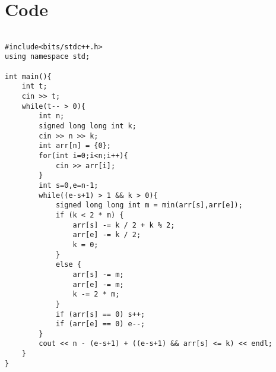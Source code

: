 \documentclass{article}
\begin{document}
\newpage
\section{Code}

\begin{lstlisting}

#include<bits/stdc++.h>
using namespace std;

int main(){
    int t;
    cin >> t;
    while(t-- > 0){
        int n;
        signed long long int k;
        cin >> n >> k;
        int arr[n] = {0};
        for(int i=0;i<n;i++){
            cin >> arr[i];
        }
        int s=0,e=n-1;
        while((e-s+1) > 1 && k > 0){
            signed long long int m = min(arr[s],arr[e]);
            if (k < 2 * m) {
                arr[s] -= k / 2 + k % 2;
                arr[e] -= k / 2;
                k = 0;
            } 
            else {
                arr[s] -= m;
                arr[e] -= m;
                k -= 2 * m;
            }
            if (arr[s] == 0) s++;
            if (arr[e] == 0) e--;
        }
        cout << n - (e-s+1) + ((e-s+1) && arr[s] <= k) << endl;
    }
}

\end{lstlisting}
\end{document}
